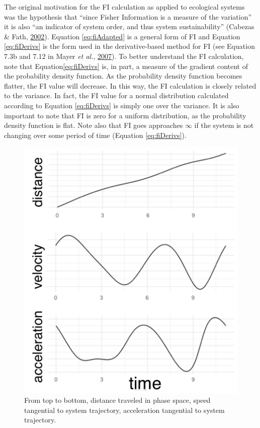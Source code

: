 \documentclass[print]{nuthesis}
\begin{document}
The original motivation for the FI calculation as applied to ecological systems was the hypothesis that ``since Fisher Information is a measure of the variation'' it is also ``an indicator of system order, and thus system sustainability'' (Cabezas \& Fath, \protect\hyperlink{ref-cabezas_towards_2002}{2002}). Equation \eqref{eq:fiAdapted} is a general form of FI and Equation \eqref{eq:fiDerivs} is the form used in the derivative-based method for FI (see Equation 7.3b and 7.12 in Mayer \emph{et al.}, \protect\hyperlink{ref-mayer_applications_2007}{2007}). To better understand the FI calculation, note that Equation\eqref{eq:fiDerivs} is, in part, a measure of the gradient content of the probability density function. As the probability density function becomes flatter, the FI value will decrease. In this way, the FI calculation is closely related to the variance. In fact, the FI value for a normal distribution calculated according to Equation \eqref{eq:fiDerivs} is simply one over the variance. It is also important to note that FI is zero for a uniform distribution, as the probability density function is flat. Note also that FI goes approaches \(\infty\) if the system is not changing over some period of time (Equation \eqref{eq:fiDerivs}).
\begin{figure}
\includegraphics[width=0.95\linewidth]{./chapterFiles/fiGuide/figures/distSppedAccel} \caption{From top to bottom, distance traveled in phase space, speed tangential to system trajectory, acceleration tangential to system trajectory.}\label{fig:distSpeedAccel}
\end{figure}
\end{document}
